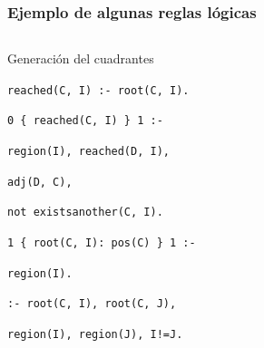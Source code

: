 \begin{frame}
	\frametitle{Ejemplo de algunas reglas lógicas}

	\begin{columns}
	
	\begin{block}{\small Generación del cuadrantes}
		\small
		
		\vspace{1em}
		\hspace{1em}\texttt{reached(C, I) :- root(C, I).}
		
		\vspace{1em}
		
		\hspace{1em}\texttt{0 \{ reached(C, I) \} 1 :- }
		
		\hspace{3em}\texttt{region(I), reached(D, I),}
		
		\hspace{3em}\texttt{adj(D, C),}
		
		\hspace{3em}\texttt{not existsanother(C, I).}
		
		\vspace{1em}
		
		\hspace{1em}\texttt{1 \{ root(C, I): pos(C) \} 1 :-}
		
		\hspace{3em}\texttt{region(I).}
		
		\vspace{1em}
		
		\hspace{1em}\texttt{:- root(C, I), root(C, J),}
		
		\hspace{3em}\texttt{region(I), region(J), I!=J.}
		\vspace{1em}
	\end{block}
	

\end{columns}
\end{frame}
